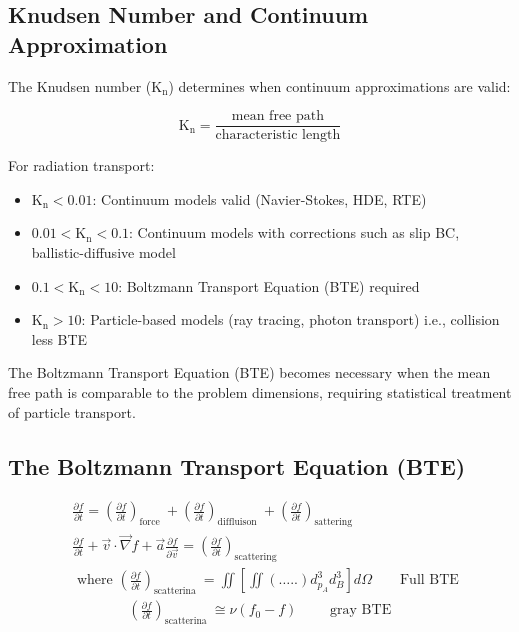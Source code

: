 \subsection*{Knudsen Number and Continuum Approximation}

The Knudsen number ($\operatorname{K_n}$) determines when continuum approximations are valid:

\[
    \operatorname{K_n} = \frac{\text{mean free path}}{\text{characteristic length}}
\]

For radiation transport:
\begin{itemize}
    \item $\operatorname{K_n} < 0.01$: Continuum models valid (Navier-Stokes, HDE, RTE)
    \item $0.01 < \operatorname{K_n} < 0.1$: Continuum models with corrections such as slip BC, ballistic-diffusive model
    \item $0.1 < \operatorname{K_n} < 10$: Boltzmann Transport Equation (BTE) required
    \item $\operatorname{K_n} > 10$: Particle-based models (ray tracing, photon transport) i.e., collision less BTE
\end{itemize}

The Boltzmann Transport Equation (BTE) becomes necessary when the mean free path is comparable to the problem dimensions, requiring statistical treatment of particle transport.
\subsection*{The Boltzmann Transport Equation (BTE)}
\[
    \begin{aligned}
    & \frac{\partial f}{\partial t}=\left(\frac{\partial f}{\partial t}\right)_{\text {force }}+\left(\frac{\partial f}{\partial t}\right)_{\text {diffluison }}+\left(\frac{\partial f}{\partial t}\right)_{\text {sattering }} 
    \\[1em]
    & \frac{\partial f}{\partial t}+\vec{v} \cdot \vec{\nabla} f+\vec{a} \frac{\partial f}{\partial \vec{v}}=\left(\frac{\partial f}{\partial t}\right)_{\text {scattering }} 
    \\[1em]
    & \text { where }\left(\frac{\partial f}{\partial t}\right)_{\text {scatterina }}=\iint\left[\iint(\ldots . .) d_{p_A}^3 d_B^3\right] d \Omega \qquad {\text{Full BTE}}
    \\[1em]
    & \qquad \qquad \left(\frac{\partial f}{\partial t}\right)_{\text {scatterina }} \cong \nu\left(f_0-f\right) \qquad \text { gray BTE} 
    \end{aligned}
\]


